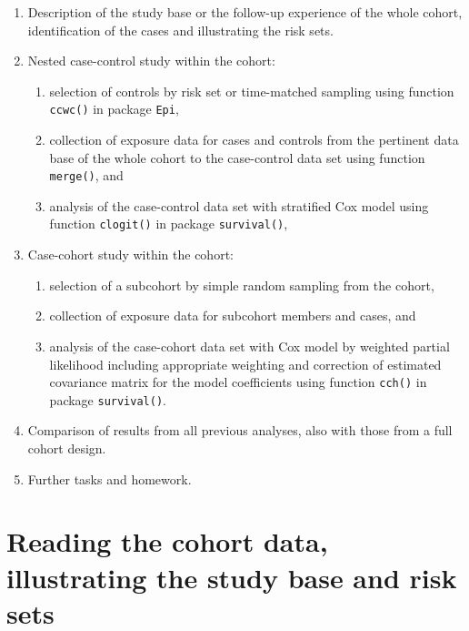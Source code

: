 \documentclass[
]{book}
\providecommand{\tightlist}{%
  \setlength{\itemsep}{0pt}\setlength{\parskip}{0pt}}
\begin{document}
\begin{enumerate}
\def\labelenumi{\arabic{enumi}.}
\item
  Description of the study base or the follow-up experience of the
  whole cohort, identification of the cases and illustrating the risk sets.
\item
  Nested case-control study within the cohort:

  \begin{enumerate}
  \def\labelenumii{(\roman{enumii})}
  \tightlist
  \item
    selection of controls by risk set or time-matched sampling
    using function \texttt{ccwc()} in package \texttt{Epi},
  \item
    collection of exposure data for cases and controls
    from the pertinent data base of the whole cohort to the
    case-control data set using function \texttt{merge()}, and
  \item
    analysis of the case-control data set with stratified Cox
    model using function \texttt{clogit()} in package \texttt{survival()},
  \end{enumerate}
\item
  Case-cohort study within the cohort:

  \begin{enumerate}
  \def\labelenumii{(\roman{enumii})}
  \tightlist
  \item
    selection of a subcohort by simple random sampling from the cohort,
  \item
    collection of exposure data for subcohort members and cases, and
  \item
    analysis of the case-cohort data set with Cox model by weighted partial
    likelihood including appropriate weighting and correction of estimated
    covariance matrix for the model coefficients using function \texttt{cch()} in package \texttt{survival()}.
  \end{enumerate}
\item
  Comparison of results from all previous analyses, also with those from a full cohort design.
\item
  Further tasks and homework.
\end{enumerate}

\section{Reading the cohort data, illustrating the study base and risk sets}\label{reading-the-cohort-data-illustrating-the-study-base-and-risk-sets}
\end{document}
